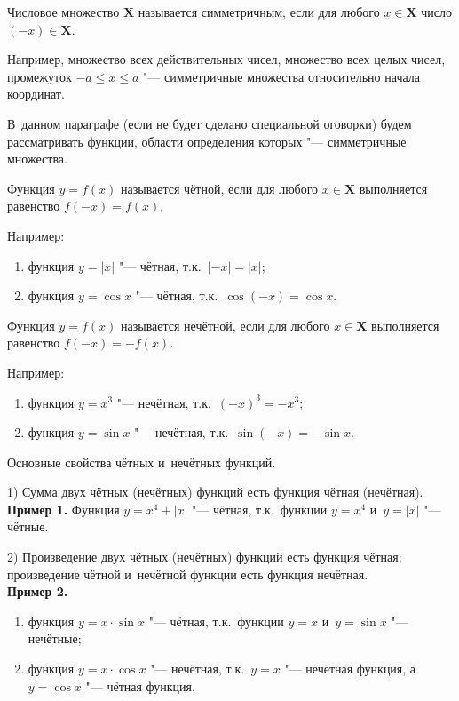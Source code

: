 \begin{Def}
Числовое множество $\mathbf{X}$ называется симметричным, если для любого
$x \in \mathbf{X}$ число $(-x) \in \mathbf{X}$.
\end{Def}

Например, множество всех действительных чисел, множество всех целых чисел,
промежуток $-a \leqslant x \leqslant a$ "--- симметричные множества
относительно начала координат.

В~данном параграфе (если не будет сделано специальной оговорки) будем
рассматривать функции, области определения которых "---
симметричные множества.

\begin{Def}
Функция $y = f(x)$ называется чётной, если для любого $x \in \mathbf{X}$
выполняется равенство $f(-x) = f(x)$.
\end{Def}
Например:
\begin{enumerate}
\item функция $y = |x|$ "--- чётная, т.к.\ $|-x| = |x|$;
\item функция $y = \cos x$ "--- чётная, т.к.\ $\cos (-x) = \cos x$.
\end{enumerate}

\begin{Def}
Функция $y = f(x)$ называется нечётной, если для любого $x \in \mathbf{X}$
выполняется равенство $f(-x) = -f(x)$.
\end{Def}
Например:
\begin{enumerate}
\item функция $y = x^{3}$ "--- нечётная, т.к.\ $(-x)^{3} = -x^{3}$;
\item функция $y = \sin x$ "--- нечётная, т.к.\ $\sin (-x) = -\sin x$.
\end{enumerate}

Основные свойства чётных и~нечётных функций.

1) Сумма двух чётных (нечётных) функций есть функция чётная (нечётная). \\
\textbf{Пример 1.} Функция $y = x^{4} + |x|$ "--- чётная, т.к.\ функции
$y = x^{4}$ и~$y = |x|$ "--- чётные.

2) Произведение двух чётных (нечётных) функций есть функция чётная;
произведение чётной и~нечётной функции есть функция нечётная. \\
\textbf{Пример 2.}
\begin{enumerate}
\item функция $y = x \cdot \sin x$ "--- чётная, т.к.\ функции
$y = x$ и~$y = \sin x$ "--- нечётные;
\item функция $y = x \cdot \cos x$ "--- нечётная, т.к.\ $y = x$ "---
нечётная функция, а~$y = \cos x$ "--- чётная функция.
\end{enumerate}

